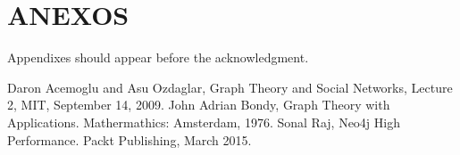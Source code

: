 \documentclass[letterpaper, 10 pt, conference]{ieeeconf}  %
\begin{document}
\section*{ANEXOS}

Appendixes should appear before the acknowledgment.







\begin{thebibliography}{10}

 Daron Acemoglu and Asu Ozdaglar, Graph Theory and Social Networks, Lecture 2, MIT, September 14, 2009.
 John Adrian Bondy, Graph Theory with Applications.	Mathermathics: Amsterdam, 1976.
 Sonal Raj, Neo4j High Performance.	Packt Publishing, March 2015.
\end{thebibliography}
\end{document}
